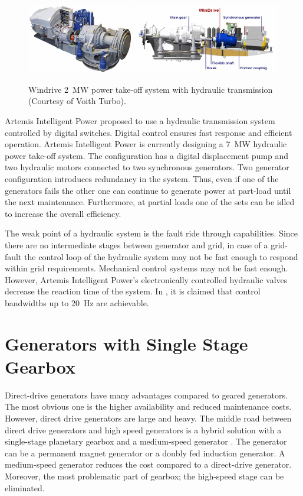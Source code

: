 \documentclass[a4paper, 11pt]{article} %
\begin{document}
  \begin{figure}
    \centering
    \includegraphics[height=1.2in]{voith_windrive}
    \includegraphics[height=1.2in]{voith_schematic}
    \caption{Windrive 2~MW power take-off system with hydraulic transmission (Courtesy of Voith Turbo).} 
    \label{voith}
  \end{figure}

Artemis Intelligent Power proposed to use a hydraulic transmission system controlled by digital switches. Digital control ensures fast response and efficient operation. Artemis Intelligent Power is currently designing a 7~MW hydraulic power take-off system. The configuration has a digital displacement pump and two hydraulic motors connected to two synchronous generators. Two generator configuration introduces redundancy in the system. Thus, even if one of the generators fails the other one can continue to generate power at part-load until the next maintenance. Furthermore, at partial loads one of the sets can be idled to increase the overall efficiency.

The weak point of a hydraulic system is the fault ride through capabilities. Since there are no intermediate stages between generator and grid, in case of a grid-fault the control loop of the hydraulic system may not be fast enough to respond within grid requirements. Mechanical control systems may not be fast enough. However, Artemis Intelligent Power's electronically controlled hydraulic valves decrease the reaction time of the system. In \cite{artemis}, it is claimed that control bandwidths up to 20~Hz are achievable.

\section{Generators with Single Stage Gearbox}

Direct-drive generators have many advantages compared to geared generators. The most obvious one is the higher availability and reduced maintenance costs. However, direct drive generators are large and heavy. The middle road between direct drive generators and high speed generators is a hybrid solution with a single-stage planetary gearbox and a medium-speed generator \cite{Li2009}. The generator can be a permanent magnet generator or a doubly fed induction generator. A medium-speed generator reduces the cost compared to a direct-drive generator. Moreover, the most problematic part of gearbox; the high-speed stage can be eliminated.
\end{document}
